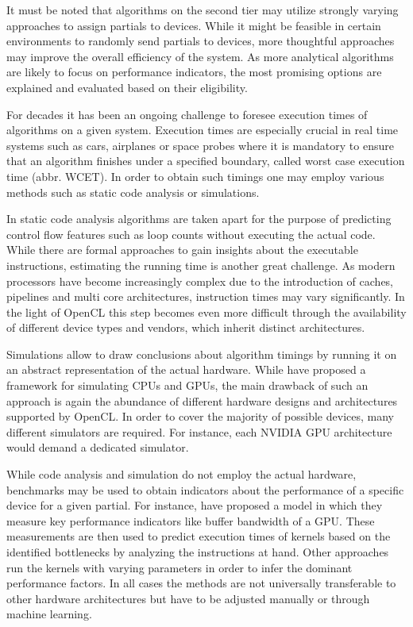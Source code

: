 It must be noted that algorithms on the second tier may utilize strongly varying approaches to assign partials to devices. While it might be feasible in certain environments to randomly send partials to devices, more thoughtful approaches may improve the overall efficiency of the system. As more analytical algorithms are likely to focus on performance indicators, the most promising options are explained and evaluated based on their eligibility.

For decades it has been an ongoing challenge to foresee execution times of algorithms on a given system. Execution times are especially crucial in real time systems such as cars, airplanes or space probes where it is mandatory to ensure that an algorithm finishes under a specified boundary, called worst case execution time (abbr. WCET). In order to obtain such timings one may employ various methods such as static code analysis or simulations\cite{wcet}.

In static code analysis algorithms are taken apart for the purpose of predicting control flow features such as loop counts without executing the actual code\cite{loopbound}\cite{sweet}. While there are formal approaches to gain insights about the executable instructions, estimating the running time is another great challenge. As modern processors have become increasingly complex due to the introduction of caches, pipelines and multi core architectures, instruction times may vary significantly\cite{wcet}. In the light of OpenCL this step becomes even more difficult through the availability of different device types and vendors, which inherit distinct architectures.

Simulations allow to draw conclusions about algorithm timings by running it on an abstract representation of the actual hardware\cite{wcet}. While \citeauthor{multi2sim} have proposed a framework for simulating CPUs and GPUs\cite{multi2sim}, the main drawback of such an approach is again the abundance of different hardware designs and architectures supported by OpenCL. In order to cover the majority of possible devices, many different simulators are required. For instance, each NVIDIA GPU architecture would demand a dedicated simulator.

While code analysis and simulation do not employ the actual hardware, benchmarks may be used to obtain indicators about the performance of a specific device for a given partial. For instance, \citeauthor{quantitative_performance} have proposed a model in which they measure key performance indicators like buffer bandwidth of a GPU\cite{quantitative_performance}. These measurements are then used to predict execution times of kernels based on the identified bottlenecks by analyzing the instructions at hand. Other approaches run the kernels with varying parameters in order to infer the dominant performance factors\cite{gpgpu_performance}. In all cases the methods are not universally transferable to other hardware architectures but have to be adjusted manually or through machine learning.


